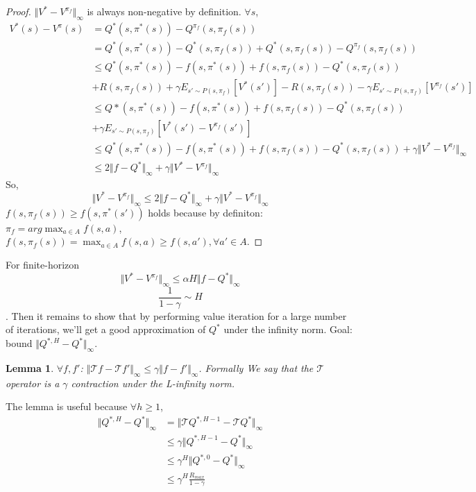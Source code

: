 \documentclass{report}
\newtheorem{lemma}[theorem]{Lemma}
\begin{document}
\begin{proof}
$\Vert V^*-V^{\pi_f}\Vert_{\infty}$ is always non-negative by definition. $\forall s$, 
\begin{equation*}
\begin{split}
V^{*}(s)-V^{\pi}(s) &= Q^*(s,\pi^*(s))-Q^{\pi_f}(s,\pi_f(s))\\
&= Q^*(s,\pi^*(s))-Q^*(s,\pi_f(s))+Q^*(s,\pi_f(s))-Q^{\pi_f}(s,\pi_f(s))\\
&\leq Q^*(s,\pi^{*}(s))-f(s,\pi^{*}(s))+f(s,\pi_f(s))-Q^*(s,\pi_f(s))\\
& +R(s,\pi_f(s))+\gamma E_{s'\sim P(s,\pi_f)}[V^*(s')]-R(s,\pi_f(s)) - \gamma E_{s'\sim P(s,\pi_f)}[V^{\pi_f}(s')] \\
&\leq Q*(s,\pi^{*}(s))-f(s,\pi^{*}(s))+f(s,\pi_f(s))-Q^*(s,\pi_f(s))\\
&+ \gamma E_{s'\sim P(s,\pi_f)}[V^*(s')-V^{\pi_f}(s')] \\
&\leq Q^*(s,\pi^{*}(s))-f(s,\pi^{*}(s))+f(s,\pi_f(s))-Q^*(s,\pi_f(s)) + \gamma \Vert V^*-V^{\pi_f} \Vert_{\infty} \\
&\leq 2\Vert f-Q^*\Vert_{\infty} + \gamma \Vert V^*-V^{\pi_f} \Vert_{\infty}
\end{split}
\end{equation*}
So, \[
\Vert V^*-V^{\pi_f} \Vert_{\infty} \leq 2\Vert f-Q^*\Vert_{\infty} + \gamma \Vert V^*-V^{\pi_f} \Vert_{\infty}
\]
$f(s,\pi_f(s)) \geq f(s,\pi^*(s'))$ holds because by definiton: $\pi_f=arg\max_{a\in A}f(s,a)$, $f(s,\pi_f(s))=\max_{a\in A}f(s,a) \geq f(s,a'), \forall a' \in A$.
\end{proof}
For finite-horizon \[\Vert  V^*-V^{ \pi_f} \Vert_{\infty} \leq \alpha H \Vert f-Q^{*}\Vert_{\infty}\]
\[\frac{1}{1-\gamma} \sim H\].
Then it remains to show that by performing value iteration for a large number of iterations, we'll get a good  approximation of $Q^*$ under the infinity norm. Goal: bound $\Vert Q^{*,H}-Q^{*}\Vert_{\infty}$.
\begin{lemma}
$\forall f,f'$: $\Vert\mathcal{T}f-\mathcal{T}f'\Vert_{\infty}\leq \gamma \Vert f-f'\Vert_{\infty}$. Formally We say that the $\mathcal{T}$ operator is a $\gamma$ contraction under the L-infinity norm.
\end{lemma}
The lemma is useful because $\forall h \geq 1$, 
\begin{equation*}
\begin{split}
    \Vert Q^{*,H}-Q^{*}\Vert_{\infty}&=\Vert \mathcal{T}Q^{*,H-1}-\mathcal{T}Q^{*}\Vert_{\infty}\\
    & \leq \gamma \Vert Q^{*,H-1}-Q^{*}\Vert_{\infty} \\
    & \leq \gamma^H \Vert Q^{*,0}-Q^{*}\Vert_{\infty} \\
    & \leq \gamma^{H} \frac{R_{max}}{1-\gamma}
\end{split}
\end{equation*}
\end{document}
